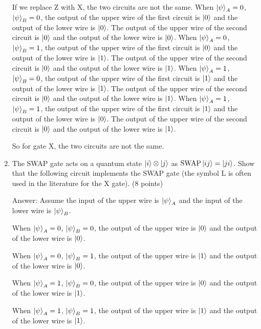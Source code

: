 \documentclass{article}
\begin{document}
\begin{enumerate}
          If we replace Z with X, the two circuits are not the same.
          When $\ket{\psi}_A=0$, $\ket{\psi}_B=0$, the output of the upper wire of the first circuit is $\ket{0}$ and the output of the lower wire is $\ket{0}$. The output of the upper wire of the second circuit is $\ket{0}$ and the output of the lower wire is $\ket{0}$.
          When $\ket{\psi}_A=0$, $\ket{\psi}_B=1$, the output of the upper wire of the first circuit is $\ket{0}$ and the output of the lower wire is $\ket{1}$. The output of the upper wire of the second circuit is $\ket{0}$ and the output of the lower wire is $\ket{1}$.
          When $\ket{\psi}_A=1$, $\ket{\psi}_B=0$, the output of the upper wire of the first circuit is $\ket{1}$ and the output of the lower wire is $\ket{1}$. The output of the upper wire of the second circuit is $\ket{0}$ and the output of the lower wire is $\ket{1}$.
          When $\ket{\psi}_A=1$, $\ket{\psi}_B=1$, the output of the upper wire of the first circuit is $\ket{1}$ and the output of the lower wire is $\ket{0}$. The output of the upper wire of the second circuit is $\ket{0}$ and the output of the lower wire is $\ket{1}$.

          So for gate X, the two circuits are not the same.

    \item The SWAP gate acts on a quantum state $\ket{i} \otimes \ket{j}$ as $\text{SWAP} \ket{ij} = \ket{ji}$. Show that the following circuit implements the SWAP gate (the symbol L is often used in the literature for the X gate). (8 points)

          Answer: Assume the input of the upper wire is $\ket{\psi}_A$ and the input of the lower wire is $\ket{\psi}_B$.

          When $\ket{\psi}_A=0$, $\ket{\psi}_B=0$, the output of the upper wire is $\ket{0}$ and the output of the lower wire is $\ket{0}$.

          When $\ket{\psi}_A=0$, $\ket{\psi}_B=1$, the output of the upper wire is $\ket{1}$ and the output of the lower wire is $\ket{0}$.

          When $\ket{\psi}_A=1$, $\ket{\psi}_B=0$, the output of the upper wire is $\ket{0}$ and the output of the lower wire is $\ket{1}$.

          When $\ket{\psi}_A=1$, $\ket{\psi}_B=1$, the output of the upper wire is $\ket{1}$ and the output of the lower wire is $\ket{1}$.
\end{enumerate}
\end{document}
